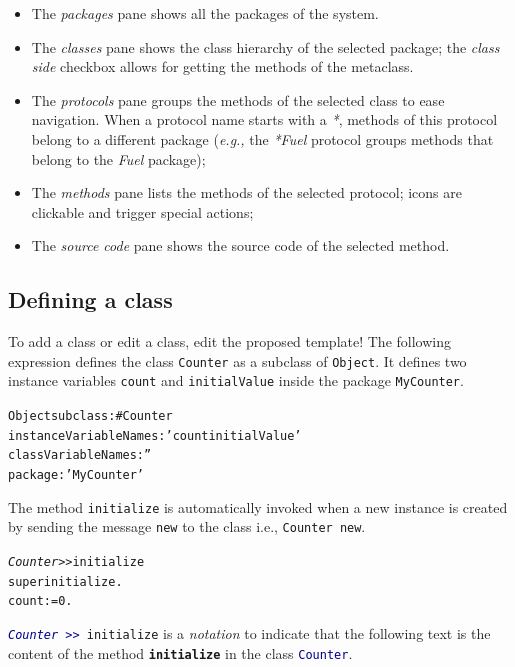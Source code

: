 \documentclass[notumble]{leaflet}
\makeatletter
\newcommand{\eg}{\emph{e.g.,}\xspace}
\newenvironment{displaycode}{%
     \par
     \hspace{1.5em}\begin{minipage}{\linewidth}
       \begin{alltt}\small}{
       \end{alltt}
     \end{minipage}
     \par}
\newcommand{\code}[1]{\foreignlanguage{english}{\texttt{#1}}}
\makeatother
\begin{document}
\begin{itemize}
\item The \emph{packages} pane shows all the packages of the system.
\item The \emph{classes} pane shows the class hierarchy of the
  selected package; the \emph{class side} checkbox allows for getting
  the methods of the metaclass.
\item The \emph{protocols} pane groups the methods of the selected
  class to ease navigation.  When a protocol name starts with a \emph{*}, methods of this
  protocol belong to a different package (\eg the \emph{*Fuel}
  protocol groups methods that belong to the \emph{Fuel} package);
\item The \emph{methods} pane lists the methods of the selected
  protocol; icons are clickable and trigger special actions;
\item The \emph{source code} pane shows the source code of the
  selected method. 
\end{itemize}

\vspace{-0.3cm}
\subsection{Defining a class}
To add a class or edit a class, edit the proposed template!
The following expression defines the class \code{Counter} as a subclass of \code{Object}.
It defines two instance variables \code{count} and \code{initialValue} inside the package \code{MyCounter}.

\begin{displaycode}
Object subclass: #Counter
   instanceVariableNames: 'count initialValue'
   classVariableNames: '' 
   package: 'MyCounter'
\end{displaycode}

The method \code{initialize} is automatically invoked when a new instance is created by sending the message \code{new} to the class i.e., \code{Counter new}.   

\begin{displaycode}
\textit{Counter >>} initialize 
    super initialize.
    count := 0. 
\end{displaycode}

\code{\textcolor{darkBlue}{\textit{Counter}\,>{}>\,}initialize} is a \textit{notation} to indicate that the following text is the content of the method \code{\textbf{initialize}} in the class \code{\textcolor{darkBlue}{Counter}}.
\end{document}
